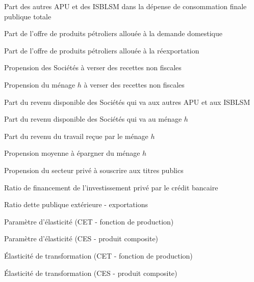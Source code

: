 \documentclass[11pt,a4paper]{article}
\newcommand{\firm}{\mathsf{firm}}
\newcommand{\ngo}{\mathsf{ngo}}
\newcommand{\ntyf}{\mathit{ntyf}}
\newcommand{\ntyh}{\mathit{ntyh}}
\newcommand{\trj}{\mathit{trj}}
\newcommand{\BG}{\mathit{BG}}
\newcommand{\CTNGO}{\mathit{CTNGO}}
\newcommand{\DCP}{\mathit{DCP}}
\newcommand{\EX}{\mathit{EX}}
\newcommand{\TRA}{\mathit{TRA}}
\begin{document}
\begin{description}[leftmargin=!,labelwidth=\widthof{\bfseries AAAAAAAA},parsep=10.5pt]
		\item[$\mu^{\CTNGO}$]   Part des autres APU et des ISBLSM dans la dépense de consommation finale publique totale
		
		\item[$\mu^D$] Part de l'offre de produits pétroliers allouée à la demande domestique
		
		\item[$\mu^E$] Part de l'offre de produits pétroliers allouée à la réexportation
		
		\item[$\ntyf$] Propension des Sociétés à verser des recettes non fiscales
		
		\item[$\ntyh_h$] Propension du ménage $h$ à verser des recettes non fiscales
		
		\item[$\lambda^{\TRA}_{\ngo,\firm}$]   Part du revenu disponible des Sociétés qui va aux autres APU et aux ISBLSM
		
		\item[$\lambda^{\TRA}_{h,\firm}$]   Part du revenu disponible des Sociétés qui va au ménage $h$
		
		\item[$\phi_h$] Part du revenu du travail reçue par le ménage $h$
		
		\item[$\psi_h$] Propension moyenne à épargner du ménage $h$
		
		\item[$\psi^{\BG}$] Propension du secteur privé à souscrire aux titres publics
		
		\item[$\psi^{\DCP}$] Ratio de financement de l'investissement privé par le crédit bancaire
		
		\item[$\psi^{\EX}$]  Ratio dette publique extérieure - exportations
		
		\item[$\rho_{\trj}^E$] Paramètre d'élasticité (CET - fonction de production)
		
		\item[$\rho_{\trj}^M$] Paramètre d'élasticité (CES - produit composite)
		
		\item[$\sigma_{\trj}^E$] Élasticité de transformation (CET - fonction de production)
		
		\item[$\sigma_{\trj}^M$] Élasticité de transformation (CES - produit composite)
		

\end{description}
\end{document}
